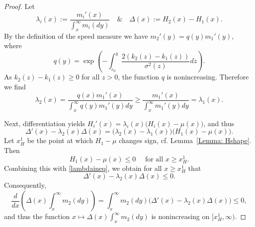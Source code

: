 \documentclass[12pt]{article}
\begin{document}
\begin{proof}
    Let 
    \begin{equation*}
       \lambda_i(x) := \frac{m_{i}'(x)}{\int_x^\infty m_{i}(dy)}\quad\& \quad  \Delta(x) := H_2(x)-H_1(x).
    \end{equation*}
By the definition of the speed measure we have $m_{2}'(y) = q(y)m_{1}'(y),$ where
    \begin{equation*}
        q(y) = \exp{\left(-\int^{y}_{c_0}\frac{2(k_2(z)-k_1(z))}{\sigma^2(z)}dz \right)}.
    \end{equation*}
    As $k_2(z)-k_1(z) \geq 0$ for all $z>0$, the function $q$ is nonincreasing. Therefore we find
    \begin{equation}\label{lambdaineq}
        \lambda_2(x) = \frac{q(x)m_{1}'(x)}{\int_x^\infty q(y)m_{1}'(y)dy} \geq \frac{m_{1}'(x)}{\int_x^\infty m_{1}'(y)dy} = \lambda_1(x).
    \end{equation}
    
    Next, differentiation yields $H_i'(x) =  \lambda_i(x) \big(H_i(x)-\mu(x)\big)$, and thus
    \begin{equation*}
        \Delta'(x)-\lambda_2(x)\Delta(x) = \big( \lambda_2(x)-\lambda_1(x)\big)\big(H_1(x)-\mu(x) \big).
    \end{equation*}
    Let $x_H^1$ be the point at which $H_1-\mu$ changes sign, cf. Lemma~\ref{Lemma: Hshape}. Then
    \begin{equation*}
        H_1(x)-\mu(x) \leq 0 \quad \text{ for all } x \geq x_H^1.
    \end{equation*}
    Combining this with \eqref{lambdaineq}, we obtain for all $x \geq x_H^1$ that 
    \begin{equation} \label{Eq: DeltaIneq}
        \Delta'(x)-\lambda_2(x)\Delta(x) \leq 0.
    \end{equation}
    Consequently,
    \begin{equation*}
        \frac{d}{dx} \left( \Delta(x)\int_x^\infty m_{2}(dy) \right) = \int_x^\infty m_{2}(dy) \big(\Delta'(x)-\lambda_2(x)\Delta(x)\big) \leq 0,
    \end{equation*}
    and thus the function $x \mapsto \Delta(x) \int_x^\infty m_{2}(dy)$ is nonincreasing on $[x_H^1,\infty)$. 
    

\end{proof}
\end{document}
